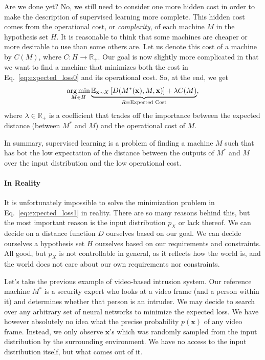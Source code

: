 \documentclass{report}
\newcommand{\vect}[1]{\mathbf{#1}}
\newcommand{\vx}[0]{\vect{x}}
\DeclareMathOperator*{\argmin}{\arg \min}
\begin{document}
Are we done yet? No, we still need to consider one more hidden cost in order to
make the description of supervised learning more complete. This hidden cost
comes from the operational cost, or {\it complexity}, of each machine $M$ in the
hypothesis set $H$.  It is reasonable to think that some machines are cheaper or
more desirable to use than some others are. Let us denote this cost of a machine
by $C(M)$, where $C: H \to \mathbb{R}_+$. Our goal is now slightly more
complicated in that we want to find a machine that minimizes both the cost in
Eq.~\eqref{eq:expected_loss0} and its operational cost. So, at the end, we get
\begin{align}
    \label{eq:expected_loss1}
    \argmin_{M \in H} \underbrace{\mathbb{E}_{\vx \sim X} \left[ D(M^*(\vx), M, \vx) \right]
        + \lambda C(M)
    }_{
        \mathclap{R = \text{Expected Cost}}
    },
\end{align}
where $\lambda \in \mathbb{R}_+$ is a coefficient that trades off the importance
between the expected distance (between $M^*$ and $M$) and the operational cost
of $M$.

In summary, supervised learning is a problem of finding a machine $M$ such that
has bot the low expectation of the distance between the outputs of $M^*$ and
$M$ over the input distribution and the low operational cost.

\paragraph{In Reality}

It is unfortunately impossible to solve the minimization problem in
Eq.~\eqref{eq:expected_loss1} in reality. There are so many reasons behind this,
but the most important reason is the input distribution $p_X$ or lack thereof.
We can decide on a distance function $D$ ourselves based on our goal. We can
decide ourselves a hypothesis set $H$ ourselves based on our requirements and
constraints. All good, but $p_X$ is not controllable in general, as it reflects
how the world is, and the world does not care about our own requirements nor
constraints.  

Let's take the previous example of video-based intrusion system. Our reference
machine $M^*$ is a security expert who looks at a video frame (and a person
within it) and determines whether that person is an intruder. We may decide to
search over any arbitrary set of neural networks to minimize the expected loss.
We have however absolutely no idea what the precise probability $p(\vx)$ of any
video frame. Instead, we only observe $\vx$'s which was randomly sampled from
the input distribution by the surrounding environment. We have no access to the
input distribution itself, but what comes out of it. 
\end{document}
